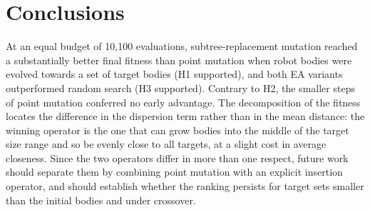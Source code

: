 \documentclass[sigconf]{acmart}
\begin{document}
\section{Conclusions}
At an equal budget of 10{,}100 evaluations, subtree-replacement mutation reached a substantially better final fitness than point mutation when robot bodies were evolved towards a set of target bodies (H1 supported), and both EA variants outperformed random search (H3 supported).
Contrary to H2, the smaller steps of point mutation conferred no early advantage.
The decomposition of the fitness locates the difference in the dispersion term rather than in the mean distance: the winning operator is the one that can grow bodies into the middle of the target size range and so be evenly close to all targets, at a slight cost in average closeness.
Since the two operators differ in more than one respect, future work should separate them by combining point mutation with an explicit insertion operator, and should establish whether the ranking persists for target sets smaller than the initial bodies and under crossover.



\end{document}
